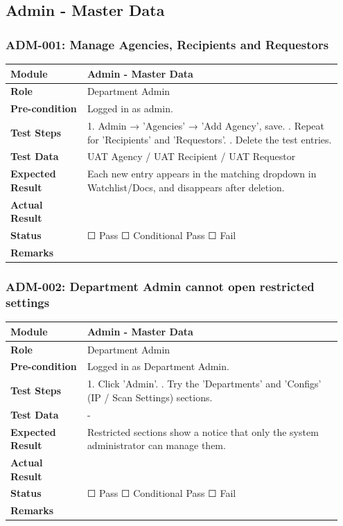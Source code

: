 \documentclass[10pt]{article}
\begin{document}
\subsection{Admin - Master Data}
\subsubsection*{ADM-001: Manage Agencies, Recipients and Requestors}
\begin{longtable}{p{0.22\linewidth}p{0.73\linewidth}}
\hline
\textbf{Module} & Admin - Master Data \\ \hline
\textbf{Role} & Department Admin \\ \hline
\textbf{Pre-condition} & Logged in as admin. \\ \hline
\textbf{Test Steps} & 1. Admin → 'Agencies' → 'Add Agency', save. \newline 2. Repeat for 'Recipients' and 'Requestors'. \newline 3. Delete the test entries. \\ \hline
\textbf{Test Data} & UAT Agency / UAT Recipient / UAT Requestor \\ \hline
\textbf{Expected Result} & Each new entry appears in the matching dropdown in Watchlist/Docs, and disappears after deletion. \\ \hline
\textbf{Actual Result} & \newline \newline \\ \hline
\textbf{Status} & ☐ Pass \quad ☐ Conditional Pass \quad ☐ Fail \\ \hline
\textbf{Remarks} & \newline \\ \hline
\end{longtable}
\subsubsection*{ADM-002: Department Admin cannot open restricted settings}
\begin{longtable}{p{0.22\linewidth}p{0.73\linewidth}}
\hline
\textbf{Module} & Admin - Master Data \\ \hline
\textbf{Role} & Department Admin \\ \hline
\textbf{Pre-condition} & Logged in as Department Admin. \\ \hline
\textbf{Test Steps} & 1. Click 'Admin'. \newline 2. Try the 'Departments' and 'Configs' (IP / Scan Settings) sections. \\ \hline
\textbf{Test Data} & - \\ \hline
\textbf{Expected Result} & Restricted sections show a notice that only the system administrator can manage them. \\ \hline
\textbf{Actual Result} & \newline \newline \\ \hline
\textbf{Status} & ☐ Pass \quad ☐ Conditional Pass \quad ☐ Fail \\ \hline
\textbf{Remarks} & \newline \\ \hline
\end{longtable}
\end{document}
